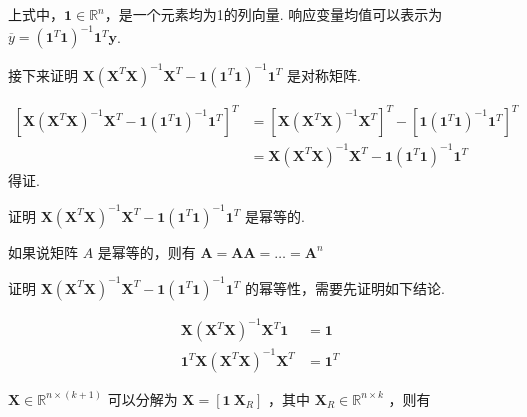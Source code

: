 \documentclass[UTF8]{ctexart}
\begin{document}
    上式中，$ \boldsymbol{1} \in \mathbb{R}^{n} $，是一个元素均为1的列向量. 响应变量均值可以表示为 $ \overline{y} = (\boldsymbol{1}^T \boldsymbol{1})^{-1} \boldsymbol{1}^T \boldsymbol{y} $.
    
    接下来证明 $ \boldsymbol{X} (\boldsymbol{X}^T \boldsymbol{X})^{-1} \boldsymbol{X}^T - \boldsymbol{1}  (\boldsymbol{1}^T \boldsymbol{1})^{-1} \boldsymbol{1}^T $ 是对称矩阵.
    
    \begin{equation}
    	\begin{aligned}
    		[\boldsymbol{X} (\boldsymbol{X}^T \boldsymbol{X})^{-1} \boldsymbol{X}^T - \boldsymbol{1}  (\boldsymbol{1}^T \boldsymbol{1})^{-1}  \boldsymbol{1}^T]^T 
    		& = [\boldsymbol{X} (\boldsymbol{X}^T \boldsymbol{X})^{-1} \boldsymbol{X}^T]^T - [\boldsymbol{1}  (\boldsymbol{1}^T \boldsymbol{1})^{-1}  \boldsymbol{1}^T]^T \\
    		& = \boldsymbol{X} (\boldsymbol{X}^T \boldsymbol{X})^{-1} \boldsymbol{X}^T - \boldsymbol{1}  (\boldsymbol{1}^T \boldsymbol{1})^{-1}  \boldsymbol{1}^T
    	\end{aligned}
    \end{equation}
    得证.
    
    证明 $ \boldsymbol{X} (\boldsymbol{X}^T \boldsymbol{X})^{-1} \boldsymbol{X}^T - \boldsymbol{1}  (\boldsymbol{1}^T \boldsymbol{1})^{-1} \boldsymbol{1}^T $ 是幂等的.
    
    如果说矩阵 $ A $ 是幂等的，则有 $ \boldsymbol{A} = \boldsymbol{A} \boldsymbol{A} = \dots = \boldsymbol{A}^n $
    
    证明 $ \boldsymbol{X} (\boldsymbol{X}^T \boldsymbol{X})^{-1} \boldsymbol{X}^T - \boldsymbol{1}  (\boldsymbol{1}^T \boldsymbol{1})^{-1} \boldsymbol{1}^T $ 的幂等性，需要先证明如下结论.
    
    
    \begin{equation}
        \begin{aligned}
            \boldsymbol{X} (\boldsymbol{X}^T \boldsymbol{X})^{-1} \boldsymbol{X}^T \boldsymbol{1} & = \boldsymbol{1} \\
            \boldsymbol{1}^T \boldsymbol{X} (\boldsymbol{X}^T \boldsymbol{X})^{-1} \boldsymbol{X}^T & = \boldsymbol{1}^T
        \end{aligned}
    \end{equation}

    $ \boldsymbol{X} \in \mathbb{R}^{n \times (k + 1)} $ 可以分解为 $ \boldsymbol{X} = [\boldsymbol{1} \  \boldsymbol{X}_R] $ ，其中 $ \boldsymbol{X}_{R} \in \mathbb{R}^{n \times k} $ ，则有 
   
\end{document}
